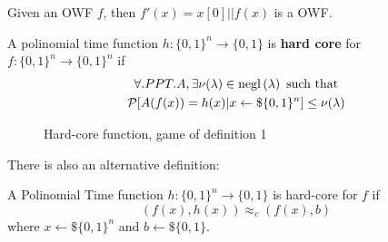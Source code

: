 \begin{example}
    Given an OWF $f$, then $f'(x)= x[0]||f(x)$ is a OWF.
\end{example}

\begin{defn}
    A polinomial time function $ h:\{0,1\}^{n} \to \{0,1\} $ is \textbf{hard
    core} for $ f:\{0,1\}^{n} \to \{0,1\}^{n} $ if 
    \begin{gather*}
        \forall.PPT. A, \exists \nu(\lambda) \in \mathrm{negl}\left({\lambda}\right) \text{  such
        that}\\
        \mathcal{P} [ A(f(x))= h(x)|x \leftarrow\$ \{0,1\}^{n} ] \leq \nu(\lambda)      
    \end{gather*}
    
\end{defn}
\newpage

\begin{figure}[h!]
   \centering
   \sdinit{}
   \caption{Hard-core function, game of definition 1}
   \label{fig:def1hcf}
\end{figure}


There is also an alternative definition:
\begin{defn}
    A Polinomial Time function $h:\{0,1\}^{n} \to \{0,1\} $ is hard-core for $f$
    if
    \[
        (f(x), h(x)) \approx_{c} (f(x), b)
    \]
    where $x \leftarrow\$\{0,1\}^{n}$ and $b \leftarrow\$\{0,1\}$.
\end{defn}


